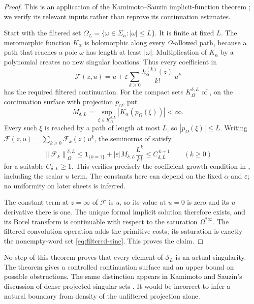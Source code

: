 \documentclass[11pt,a4paper]{article}
\numberwithin{equation}{section}
\theoremstyle{definition}
\theoremstyle{remark}
\newcommand{\norm}[1]{\left\|#1\right\|}
\newcommand{\sincost}{\mathcal S}
\begin{document}
\begin{proof}
This is an application of the Kamimoto--Sauzin implicit-function
theorem \cite[Theorem 5.3]{kamimoto-sauzin}; we verify its relevant
inputs rather than reprove its continuation estimates.

Start with the filtered set
$\Omega_L=\{\omega\in\Sigma_\alpha:|\omega|\le L\}$.
It is finite at fixed $L$. The meromorphic function $K_\alpha$ is
holomorphic along every $\Omega$-allowed path, because a path that
reaches a pole $\omega$ has length at least $|\omega|$.
Multiplication of $K_\alpha$ by a polynomial creates no new
singular locations. Thus every coefficient in
\begin{equation}\label{eq:implicit-filtered}
 \mathcal F(z,u)=u+
 \varepsilon\sum_{k\ge0}\frac{h_\alpha^{(k)}(z)}{k!}\,u^k
\end{equation}
has the required filtered continuation. For the compact sets
$K_\Omega^{\delta,L}$ of \cite[Notation 3.15]{kamimoto-sauzin},
on the continuation surface with projection $p_\Omega$, put
\[
 M_{\delta,L}=
 \sup_{\xi\in K_\Omega^{\delta,L}}
 |K_\alpha(p_\Omega(\xi))|<\infty.
\]
Every such $\xi$ is reached by a path of length at most $L$, so
$|p_\Omega(\xi)|\le L$. Writing
$\mathcal F(z,u)=\sum_{k\ge0}\mathcal F_k(z)u^k$, the seminorms
of \cite[Definition 3.16]{kamimoto-sauzin} satisfy
\[
 \norm{\mathcal F_k}_\Omega^{\delta,L}
 \le \mathbf 1_{\{k=1\}}
       +|\varepsilon|M_{\delta,L}\frac{L^k}{k!}
 \le C_{\delta,L}^{\,k+1}
 \qquad(k\ge0)
\]
for a suitable $C_{\delta,L}\ge1$.
This verifies precisely the coefficient-growth condition in
\cite[Definition 5.1]{kamimoto-sauzin}, including the scalar $u$ term.
The constants here can depend on the fixed $\alpha$ and
$\varepsilon$; no uniformity on later sheets is inferred.

The constant term at $z=\infty$ of $\mathcal F$ is $u$, so its value
at $u=0$ is zero and its $u$ derivative there is one.
The unique formal implicit solution therefore exists, and its
Borel transform is continuable with respect to the saturation
$\Omega^{*\infty}$. The filtered convolution operation adds the
primitive costs; its saturation is exactly the nonempty-word set
\eqref{eq:filtered-sine}. This proves the claim.
\end{proof}

No step of this theorem proves that every element of $\sincost_L$
is an actual singularity. The theorem gives a controlled continuation
surface and an upper bound on possible obstructions.
The same distinction appears in Kamimoto and Sauzin's discussion of
dense projected singular sets \cite[Remark 2.17]{kamimoto-sauzin}.
It would be incorrect to infer a natural boundary from density of
the unfiltered projection alone.
\end{document}

